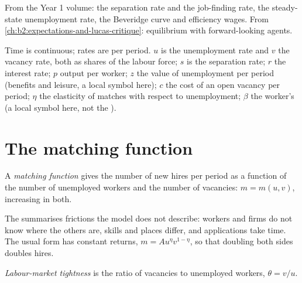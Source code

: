 \begin{recall}
From the Year 1 volume: the separation rate and the job-finding rate, the steady-state unemployment rate, the Beveridge
curve and efficiency wages. From \cref{ch:b2:expectations-and-lucas-critique}: equilibrium with forward-looking agents.
\end{recall}

\begin{notation}\label{not:b2:search-and-unemployment:symbols}
Time is continuous; rates are per period. $u$ is the unemployment rate and $v$ the vacancy rate, both as shares of the labour force; $s$ is the separation rate; $r$ the interest rate;
$p$ output per worker; $z$ the value of unemployment per period (benefits and leisure, a local symbol here); $c$ the cost of an open vacancy per period; $\eta$ the
elasticity of matches with respect to unemployment; $\beta$ the worker's  (a local symbol here, not the
).
\end{notation}

\section{The matching function}\label{sec:b2:search-and-unemployment:matching}

\begin{definition}\label{def:b2:search-and-unemployment:matching-function}
A \emph{matching function} gives the number of new hires per period as a function of the number of
unemployed workers and the number of vacancies: $m = m(u, v)$, increasing in both.
\end{definition}

The  summarises frictions the model does not describe: workers and firms do not know where the others are,
skills and places differ, and applications take time. The usual form has constant returns, $m = Au^\eta v^{1-\eta}$, so that doubling both sides doubles
hires.

\begin{definition}\label{def:b2:search-and-unemployment:tightness}
\emph{Labour-market tightness} is the ratio of vacancies to unemployed workers, $\theta = v/u$.
\end{definition}


